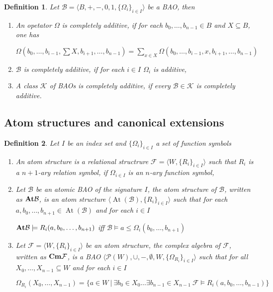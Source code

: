 \documentclass[a4paper]{article}
\theoremstyle{defin}
\newtheorem{defin}{Definition}
\theoremstyle{theorem}
\theoremstyle{prop}
\theoremstyle{lemma}
\theoremstyle{fact}
\theoremstyle{ex}
\theoremstyle{col}
\begin{document}
\begin{defin} Let $\mathcal{B} = \langle B, +, -, 0, 1, \{ \Omega_{i} \}_{i \in I} \rangle$ be a BAO, then

  \begin{enumerate}
    \item An opetator $\Omega$ is completely additive, if for each $b_0, \dots, b_{n - 1} \in B$ and $X \subseteq B$, one has

    \begin{center}
      $\Omega(b_0, \dots, b_{i-1}, \sum X, b_{i+1}, \dots, b_{n - 1}) = \sum \limits_{x \in X} \Omega(b_0, \dots, b_{i-1}, x, b_{i+1}, \dots, b_{n - 1})$
    \end{center}
    \item $\mathcal{B}$ is completely additive, if for each $i \in I$ $\Omega_{i}$ is additive,
    \item A class $\mathcal{K}$ of BAOs is completely additive, if every $\mathcal{B} \in \mathcal{K}$ is completely additive.
  \end{enumerate}
\end{defin}

\subsection{Atom structures and canonical extensions}

\begin{defin}  Let $I$ be an index set and $\{ \Omega_i\}_{i \in I}$ a set of function symbols
\begin{enumerate}
  \item An atom structure is a relational structrure
  $\mathcal{F} = \langle W, \{ R_{i} \}_{i \in I} \rangle$
  such that $R_{i}$ is a $n+1$-ary relation symbol, if $\Omega_{i \in I}$ is an $n$-ary function symbol,
  \item Let $\mathcal{B}$ be an atomic BAO of the signature $I$,
the atom structure of $\mathcal{B}$, written as ${\bf At} \mathcal{B}$, is an atom structure $\langle \operatorname{At}(\mathcal{B}), \{ R_{i}\}_{i \in I} \rangle$ such that for each
$a, b_0, \dots, b_{n + 1} \in \operatorname{At}(\mathcal{B})$ and for each $i \in I$
\begin{center}
  ${\bf At} \mathcal{B} \models R_{i}(a,  b_0, \dots, b_{n + 1})$ iff $\mathcal{B} \models a \leq \Omega_{i}(b_0, \dots, b_{n + 1})$
\end{center}
\item Let $\mathcal{F} = \langle W, \{ R_{i} \}_{i \in I} \rangle$ be an atom structure, the complex algebra of $\mathcal{F}$, written as $\bf{Cm} \mathcal{F}$, is a BAO
$\langle \mathcal{P}(W), \cup, -, \emptyset, W, \{\Omega_{R_{i}}\}_{i \in I} \rangle$ such that
for all $X_0, \dots, X_{n - 1} \subseteq W$ and for each $i \in I$
\begin{center}
  $\Omega_{R_{i}}(X_0, \dots, X_{n - 1}) = \{ a \in W \: | \: \exists b_0 \in X_0 \dots \exists b_{n -1} \in X_{n - 1} \: \mathcal{F} \models R_{i}(a, b_0, \dots, b_{n - 1})\}$
\end{center}
\end{enumerate}
\end{defin}
\end{document}
